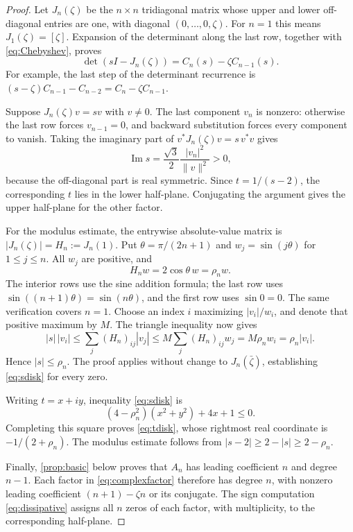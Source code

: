 \documentclass[11pt]{article}
\numberwithin{equation}{section}
\theoremstyle{definition}
\newcommand{\Impart}{\operatorname{Im}}
\begin{document}
\begin{proof}
Let $J_n(\zeta)$ be the $n\times n$ tridiagonal matrix whose upper and lower
off-diagonal entries are one, with diagonal $(0,\ldots,0,\zeta)$.
For $n=1$ this means $J_1(\zeta)=[\zeta]$.
Expansion of the determinant along the last row, together with
\eqref{eq:Chebyshev}, proves
\begin{equation}\label{eq:characteristic}
 \det(sI-J_n(\zeta))=C_n(s)-\zeta C_{n-1}(s).
\end{equation}
For example, the last step of the determinant recurrence is
$(s-\zeta)C_{n-1}-C_{n-2}=C_n-\zeta C_{n-1}$.

Suppose $J_n(\zeta)v=sv$ with $v\neq0$.  The last component $v_n$ is
nonzero: otherwise the last row forces $v_{n-1}=0$, and backward substitution
forces every component to vanish.  Taking the imaginary part of
$v^*J_n(\zeta)v=s\,v^*v$ gives
\begin{equation}\label{eq:dissipative}
 \Impart s=\frac{\sqrt3}{2}\frac{|v_n|^2}{\|v\|^2}>0,
\end{equation}
because the off-diagonal part is real symmetric.  Since
$t=1/(s-2)$, the corresponding $t$ lies in the lower half-plane.
Conjugating the argument gives the upper half-plane for the other factor.

For the modulus estimate, the entrywise absolute-value matrix is
$|J_n(\zeta)|=H_n:=J_n(1)$.
Put $\theta=\pi/(2n+1)$ and $w_j=\sin(j\theta)$ for $1\leq j\leq n$.
All $w_j$ are positive, and
\[
 H_n w=2\cos\theta\,w=\rho_n w.
\]
The interior rows use the sine addition formula; the last row uses
$\sin((n+1)\theta)=\sin(n\theta)$, and the first row uses $\sin0=0$.
The same verification covers $n=1$.
Choose an index $i$ maximizing $|v_i|/w_i$, and denote that positive maximum
by $M$.  The triangle inequality now gives
\[
 |s|\,|v_i|\leq\sum_j (H_n)_{ij}|v_j|
       \leq M\sum_j(H_n)_{ij}w_j
       =M\rho_n w_i=\rho_n|v_i|.
\]
Hence $|s|\leq\rho_n$.  The proof applies without change to
$J_n(\bar\zeta)$, establishing \eqref{eq:sdisk} for every zero.

Writing $t=x+iy$, inequality \eqref{eq:sdisk} is
\[
 (4-\rho_n^2)(x^2+y^2)+4x+1\leq0.
\]
Completing this square proves \eqref{eq:tdisk}, whose rightmost real
coordinate is $-1/(2+\rho_n)$.  The modulus estimate follows from
$|s-2|\geq2-|s|\geq2-\rho_n$.

Finally, \cref{prop:basic} below proves that $A_n$ has leading coefficient
$n$ and degree $n-1$.  Each factor in \eqref{eq:complexfactor} therefore
has degree $n$, with nonzero leading coefficient $(n+1)-\zeta n$ or its
conjugate.  The sign computation \eqref{eq:dissipative} assigns all $n$
zeros of each factor, with multiplicity, to the corresponding half-plane.
\end{proof}
\end{document}
